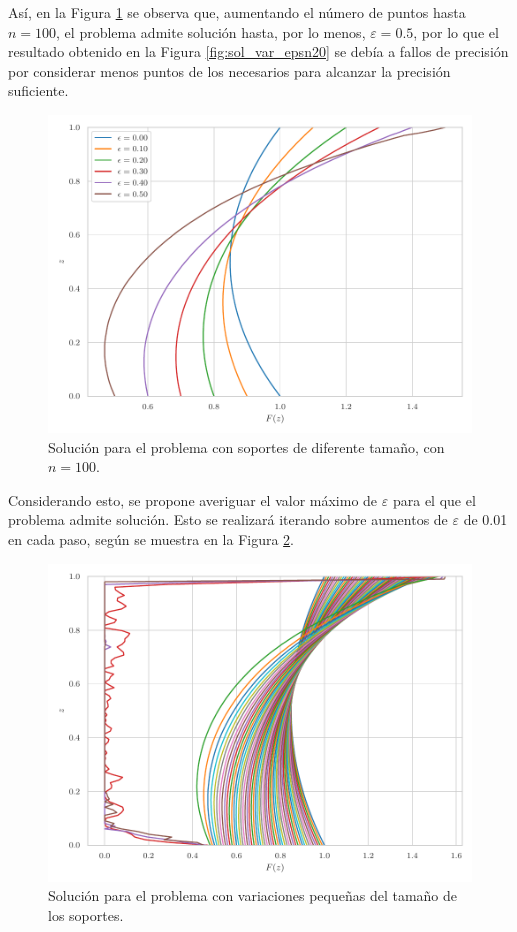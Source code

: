 Así, en la Figura \ref{fig:sol_var_epsn100} se observa que, aumentando el número de puntos hasta $n = 100$, el problema admite solución hasta, por lo menos, $\varepsilon = 0.5$, por lo que el resultado obtenido en la Figura \ref{fig:sol_var_epsn20} se debía a fallos de precisión por considerar menos puntos de los necesarios para alcanzar la precisión suficiente. 

\begin{figure}[h]
    \centering
    \includegraphics[width = 0.6 \linewidth]{Figures/01/sol_var_epsn100.pdf}
    \caption{Solución para el problema con soportes de diferente tamaño, con $n = 100$.}
    \label{fig:sol_var_epsn100}
\end{figure}

Considerando esto, se propone averiguar el valor máximo de $\varepsilon$ para el que el problema admite solución. Esto se realizará iterando sobre aumentos de $\varepsilon$ de 0.01 en cada paso, según se muestra en la Figura \ref{fig:sol_var_epsn100_cont}. 

\begin{figure}[!h]
    \centering
    \includegraphics[width = 0.6 \linewidth]{Figures/01/sol_var_epsn100_cont.pdf}
    \caption{Solución para el problema con variaciones pequeñas del tamaño de los soportes.}
    \label{fig:sol_var_epsn100_cont}
\end{figure}

